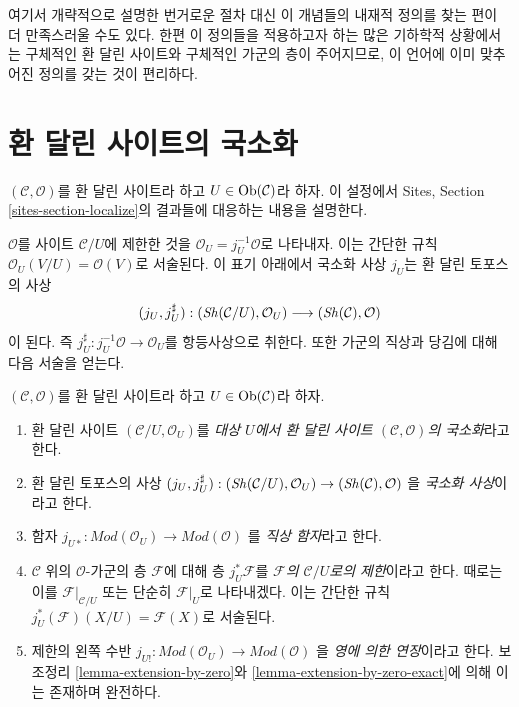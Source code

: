 \medskip\noindent
여기서 개략적으로 설명한 번거로운 절차 대신 이 개념들의 내재적 정의를
찾는 편이 더 만족스러울 수도 있다. 한편 이 정의들을 적용하고자 하는
많은 기하학적 상황에서는 구체적인 환 달린 사이트와 구체적인 가군의
층이 주어지므로, 이 언어에 이미 맞추어진 정의를 갖는 것이 편리하다.




\section{환 달린 사이트의 국소화}
\label{section-localize}

\noindent
$(\mathcal{C}, \mathcal{O})$를 환 달린 사이트라 하고
$U \in \mathop{\mathrm{Ob}}\nolimits(\mathcal{C})$라 하자. 이 설정에서 Sites, Section
\ref{sites-section-localize}의 결과들에 대응하는 내용을 설명한다.

\medskip\noindent
$\mathcal{O}$를 사이트 $\mathcal{C}/U$에 제한한 것을
$\mathcal{O}_U = j_U^{-1}\mathcal{O}$로 나타내자. 이는 간단한 규칙
$\mathcal{O}_U(V/U) = \mathcal{O}(V)$로 서술된다. 이 표기 아래에서
국소화 사상 $j_U$는 환 달린 토포스의 사상
$$
(j_U, j_U^\sharp) :
(\mathop{\mathit{Sh}}\nolimits(\mathcal{C}/U), \mathcal{O}_U)
\longrightarrow
(\mathop{\mathit{Sh}}\nolimits(\mathcal{C}), \mathcal{O})
$$
이 된다. 즉 $j_U^\sharp : j_U^{-1}\mathcal{O} \to \mathcal{O}_U$를
항등사상으로 취한다. 또한 가군의 직상과 당김에 대해 다음 서술을 얻는다.

\begin{definition}
\label{definition-localize-ringed-site}
$(\mathcal{C}, \mathcal{O})$를 환 달린 사이트라 하고
$U \in \mathop{\mathrm{Ob}}\nolimits(\mathcal{C})$라 하자.
\begin{enumerate}
\item 환 달린 사이트 $(\mathcal{C}/U, \mathcal{O}_U)$를
{\it 대상 $U$에서 환 달린 사이트 $(\mathcal{C}, \mathcal{O})$의 국소화}라고 한다.
\item 환 달린 토포스의 사상
$(j_U, j_U^\sharp) :
(\mathop{\mathit{Sh}}\nolimits(\mathcal{C}/U), \mathcal{O}_U)
\to
(\mathop{\mathit{Sh}}\nolimits(\mathcal{C}), \mathcal{O})$
을 {\it 국소화 사상}이라고 한다.
\item 함자
$j_{U*} : \textit{Mod}(\mathcal{O}_U) \to \textit{Mod}(\mathcal{O})$
를 {\it 직상 함자}라고 한다.
\item $\mathcal{C}$ 위의 $\mathcal{O}$-가군의 층 $\mathcal{F}$에 대해
층 $j_U^*\mathcal{F}$를 {\it $\mathcal{F}$의 $\mathcal{C}/U$로의 제한}이라고
한다. 때로는 이를 $\mathcal{F}|_{\mathcal{C}/U}$ 또는 단순히
$\mathcal{F}|_U$로 나타내겠다. 이는 간단한 규칙
$j_U^*(\mathcal{F})(X/U) = \mathcal{F}(X)$로 서술된다.
\item 제한의 왼쪽 수반
$j_{U!} : \textit{Mod}(\mathcal{O}_U) \to \textit{Mod}(\mathcal{O})$
을 {\it 영에 의한 연장}이라고 한다. 보조정리
\ref{lemma-extension-by-zero}와 \ref{lemma-extension-by-zero-exact}에 의해
이는 존재하며 완전하다.
\end{enumerate}
\end{definition}

